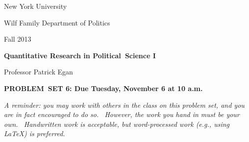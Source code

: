 \documentclass[11pt]{article}
\begin{document}
New York University

Wilf Family Department of Politics

Fall 2013

\begin{center}
{\large \textbf{Quantitative Research in Political\ Science I}}

Professor Patrick Egan

\bigskip

\textbf{PROBLEM\ SET 6: Due Tuesday, November 6 at 10 a.m.}
\end{center}

\textit{A reminder: you may work with others in the class on this problem
set, and you are in fact encouraged to do so. \ However, the work you hand
in must be your own. \ Handwritten work is acceptable, but word-processed
work (e.g., using LaTeX) is preferred.}

\bigskip
\end{document}
